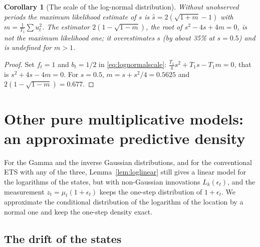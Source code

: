 \documentclass[11pt,a4paper]{article}
\newtheorem{corollary}{Corollary}
\theoremstyle{remark}
\begin{document}
\begin{corollary}[The scale of the log-normal distribution]
\label{cor:lognormalscale}
Without unobserved periods the maximum likelihood estimate of $s$ is
$\hat s = 2(\sqrt{1+m}-1)$ with $m = \frac{1}{T_1}\sum u_t^2$. The estimator
$2(1-\sqrt{1-m})$, the root of $s^2 - 4s + 4m = 0$, is not the maximum likelihood one; it
overestimates $s$ (by about 35\% at $s = 0.5$) and is undefined for $m > 1$.
\end{corollary}

\begin{proof}
Set $f_t = 1$ and $b_t = 1/2$ in \eqref{eq:lognormalscale}: $\frac{T_1}{4}s^2 + T_1 s - T_1 m = 0$,
that is $s^2 + 4s - 4m = 0$. For $s = 0.5$, $m = s + s^2/4 = 0.5625$ and $2(1-\sqrt{1-m}) = 0.677$.
\end{proof}

\section{Other pure multiplicative models: an approximate predictive density}
\label{sec:approximate}

For the Gamma and the inverse Gaussian distributions, and for the conventional ETS with any of the
three, Lemma~\ref{lem:loglinear} still gives a linear model for the logarithms of the states, but
with non-Gaussian innovations $L_k(\epsilon_t)$, and the measurement $z_t = \mu_t(1+\epsilon_t)$
keeps the one-step distribution of $1+\epsilon_t$. We approximate the conditional distribution of
the logarithm of the location by a normal one and keep the one-step density exact.

\subsection{The drift of the states}
\end{document}
